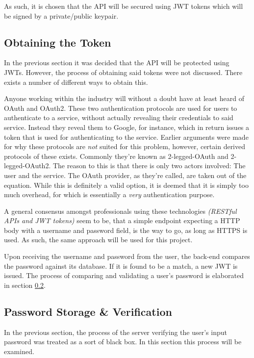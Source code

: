 				As such, it is chosen that the API will be secured using JWT tokens which will be signed by a private/public keypair.

		\subsection{Obtaining the Token}
			In the previous section it was decided that the API will be protected using JWTs. However, the process of obtaining said tokens were not discussed. There exists a number of different ways to obtain this.

			Anyone working within the industry will without a doubt have at least heard of OAuth and OAuth2. These two authentication protocols are used for users to authenticate to a service, without actually revealing their credentials to said service. Instead they reveal them to Google, for instance, which in return issues a token that is used for authenticating to the service. Earlier arguments were made for why these protocols are \emph{not} suited for this problem, however, certain derived protocols of these exists. Commonly they're known as 2-legged-OAuth and 2-legged-OAuth2. The reason to this is that there is only two actors involved: The user and the service. The OAuth provider, as they're called, are taken out of the equation. While this is definitely a valid option, it is deemed that it is simply too much overhead, for which is essentially a \emph{very} authentication purpose.

			A general consensus amongst professionals using these technologies \emph{(RESTful APIs and JWT tokens)} seem to be, that a simple endpoint expecting a HTTP body with a username and password field, is the way to go, as long as HTTPS is used\cite{jwt.io,auth0_jwt,tkalec}. As such, the same approach will be used for this project.

			Upon receiving the username and password from the user, the back-end compares the password against its database. If it is found to be a match, a new JWT is issued. The process of comparing and validating a user's password is elaborated in section \ref{sec:password}.


		\subsection{Password Storage \& Verification}
			\label{sec:password}
			In the previous section, the process of the server verifying the user's input password was treated as a sort of black box. In this section this process will be examined.


